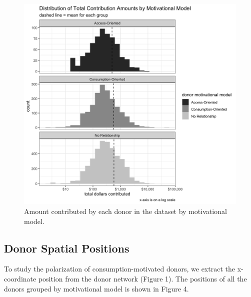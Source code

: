 \documentclass[12pt,]{article}
\begin{document}
\begin{figure}
\centering
\includegraphics{../tables_and_figures/fig_donor_sizes.jpg}
\caption{Amount contributed by each donor in the dataset by motivational
model.}
\end{figure}

\hypertarget{donor-spatial-positions}{%
\subsection{Donor Spatial Positions}\label{donor-spatial-positions}}

To study the polarization of consumption-motivated donors, we extract
the x-coordinate position from the donor network (Figure 1). The
positions of all the donors grouped by motivational model is shown in
Figure 4.
\end{document}
